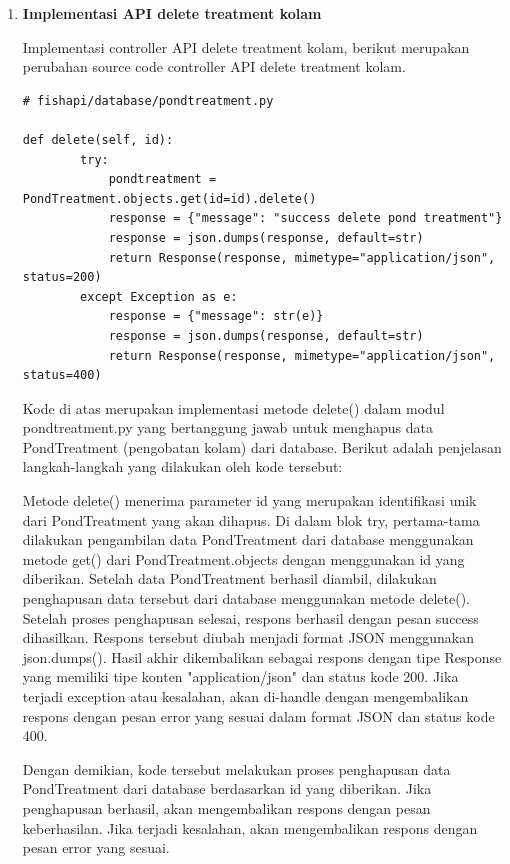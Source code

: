 \begin{enumerate}[1.]
response json:

\begin{lstlisting}
{
  "message": "success change data pond treatment",
  "id": "62f5248cae2842f914ee7797"
}
\end{lstlisting}



\item \textbf{Implementasi API delete treatment kolam}

Implementasi controller API delete treatment kolam, berikut merupakan perubahan source code controller API delete treatment kolam.

\begin{lstlisting}
# fishapi/database/pondtreatment.py

def delete(self, id):
        try:
            pondtreatment = PondTreatment.objects.get(id=id).delete()
            response = {"message": "success delete pond treatment"}
            response = json.dumps(response, default=str)
            return Response(response, mimetype="application/json", status=200)
        except Exception as e:
            response = {"message": str(e)}
            response = json.dumps(response, default=str)
            return Response(response, mimetype="application/json", status=400)
\end{lstlisting}


Kode di atas merupakan implementasi metode delete() dalam modul pondtreatment.py yang bertanggung jawab untuk menghapus data PondTreatment (pengobatan kolam) dari database. Berikut adalah penjelasan langkah-langkah yang dilakukan oleh kode tersebut:

Metode delete() menerima parameter id yang merupakan identifikasi unik dari PondTreatment yang akan dihapus. Di dalam blok try, pertama-tama dilakukan pengambilan data PondTreatment dari database menggunakan metode get() dari PondTreatment.objects dengan menggunakan id yang diberikan. Setelah data PondTreatment berhasil diambil, dilakukan penghapusan data tersebut dari database menggunakan metode delete().
Setelah proses penghapusan selesai, respons berhasil dengan pesan success dihasilkan. Respons tersebut diubah menjadi format JSON menggunakan json.dumps(). Hasil akhir dikembalikan sebagai respons dengan tipe Response yang memiliki tipe konten "application/json" dan status kode 200. Jika terjadi exception atau kesalahan, akan di-handle dengan mengembalikan respons dengan pesan error yang sesuai dalam format JSON dan status kode 400.

Dengan demikian, kode tersebut melakukan proses penghapusan data PondTreatment dari database berdasarkan id yang diberikan. Jika penghapusan berhasil, akan mengembalikan respons dengan pesan keberhasilan. Jika terjadi kesalahan, akan mengembalikan respons dengan pesan error yang sesuai.


\end{enumerate}
